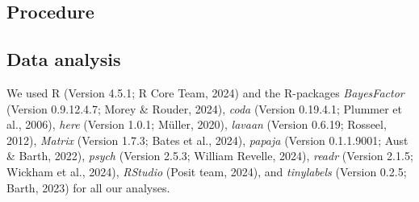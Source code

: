 \documentclass[
  man]{apa6}
\begin{document}
\subsection{Procedure}\label{procedure}

\subsection{Data analysis}\label{data-analysis}

We used R (Version 4.5.1; R Core Team, 2024) and the R-packages \emph{BayesFactor} (Version 0.9.12.4.7; Morey \& Rouder, 2024), \emph{coda} (Version 0.19.4.1; Plummer et al., 2006), \emph{here} (Version 1.0.1; Müller, 2020), \emph{lavaan} (Version 0.6.19; Rosseel, 2012), \emph{Matrix} (Version 1.7.3; Bates et al., 2024), \emph{papaja} (Version 0.1.1.9001; Aust \& Barth, 2022), \emph{psych} (Version 2.5.3; William Revelle, 2024), \emph{readr} (Version 2.1.5; Wickham et al., 2024), \emph{RStudio} (Posit team, 2024), and \emph{tinylabels} (Version 0.2.5; Barth, 2023) for all our analyses.
\end{document}
